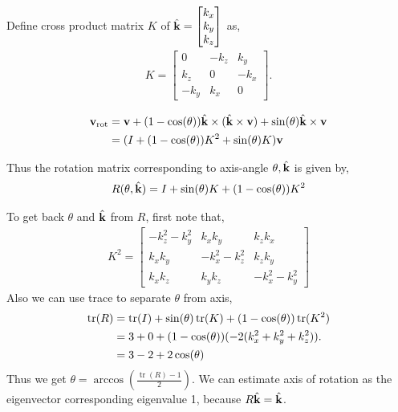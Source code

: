 \documentclass[twocolumn]{article}
\DeclareMathOperator{\tr}{tr}
\begin{document}
Define  cross  product matrix $K$  of $\hat{\mathbf{k}} = \begin{bmatrix}  k_x \\ k_y
  \\ k_z \end{bmatrix}$  as,
\begin{align}
  K  = \begin{bmatrix}
    0   & - k_z & k_y   \\
    k_z   & 0 & -k_x   \\
    -k_y   & k_x & 0
  \end{bmatrix}.
\end{align}

\begin{align}
\mathbf{v}_{\text{rot}} &=  \mathbf{v} + (1-\cos(\theta)) \hat{\mathbf{k}} \times (\hat{\mathbf{k}} \times \mathbf{v}) +  \sin(\theta) \hat{\mathbf{k}} \times \mathbf{v}
                    \notag\\
  &= (I + (1 -\cos(\theta)) K^2  + \sin(\theta) K)\mathbf{v}
\end{align}

Thus the rotation matrix corresponding  to axis-angle $\theta, \hat{\mathbf{k}}$ is
given by,
%
\begin{align}
  R(\theta, \hat{\mathbf{k}}) = I + \sin(\theta)K + (1-\cos(\theta))K^2
\end{align}
%

To get back $\theta$ and $\hat{\mathbf{k}}$   from $R$,  first  note that,
% 
\begin{align}
  K^2 =  \begin{bmatrix}
    -k_z^2  - k_y^2  & k_x k_y & k_z k_x \\
    k_xk_y  & -k_x^2- k_z^2 & k_z k_y \\
    k_x k_z  & k_y k_z &  -k_x^2  - k_y^2
    \end{bmatrix} 
\end{align}
% 
Also we can use trace to separate $\theta$ from axis,
%
\begin{align}
  \tr(R) &= \tr(I)  + \sin(\theta)\tr(K) + (1-\cos(\theta))\tr(K^2)
  \notag\\
  &= 3 + 0 + (1-\cos(\theta))(-2(k_x^2 + k_y^2 + k_z^2)).
    \notag\\
  &= 3 - 2 +2\cos(\theta)
\end{align}
%
Thus we get $\theta  =  \arccos(\frac{\tr(R)-1}{2})$. We can estimate axis of
rotation as the  eigenvector corresponding  eigenvalue 1,   because $R\hat{\mathbf{k}}
= \hat{\mathbf{k}}$.

\end{document}

